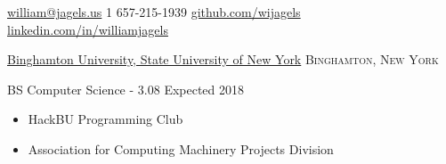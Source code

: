 \documentclass[11pt]{article}
\begin{document}
\sloppy  %



\nobreakvspace{0.3em}  %

\noindent\href{mailto:william@jagels.us}{william\mbox{}@\mbox{}jagels.us}\sbull
\textsmaller{+}1 657-215-1939\sbull
\href{https://github.com/wijagels}{github.com/wijagels}\sbull
\href{https://www.linkedin.com/in/williamjagels}{linkedin.com/in/williamjagels}



\spacedhrule{0.1em}{0.9em}  %

\headedsection
{\href{http://www.binghamton.edu/index.php}{Binghamton University, State University of New York}}
{\textsc{Binghamton, New York}} {
	\headedsubsection
	{BS Computer Science -  3.08}
	{Expected 2018}
	{\bodytext
		{
			\begin{itemize}
				\item HackBU Programming Club
				\item Association for Computing Machinery Projects Division
			\end{itemize}
		}
	}
}



\spacedhrule{0.1em}{0.9em}  %
\end{document}
